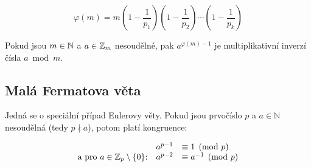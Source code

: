 \[
    \varphi(m) = m
    \left( 1 - \frac{1}{p_1} \right)
    \left( 1 - \frac{1}{p_2} \right)\cdots
    \left( 1 - \frac{1}{p_k} \right)
\]

Pokud jsou $m \in \mathbb{N}$ a $a \in \mathbb{Z}_m$ nesoudělné, pak $a^{\varphi(m)-1}$ je multiplikativní inverzí čísla $a \bmod m$.

\subsection{Malá Fermatova věta}

Jedná se o speciální případ Eulerovy věty. Pokud jsou prvočíslo $p$ a $a \in \mathbb N$ nesoudělná (tedy $p \nmid a$), potom platí kongruence:

\[
    \begin{array}{rl}
        a^{p-1}                                               & \equiv 1 \pmod{p}     \\
        \text{a pro $a\in \mathbb{Z}_p\setminus\{0\}$:} \quad a^{p-2} & \equiv a^{-1} \pmod p
    \end{array}
\]